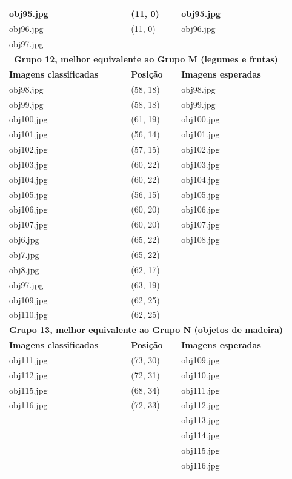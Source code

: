 \begin{center}
\begin{longtable}{|l|l|l|}
    obj95.jpg & (11, 0) & obj95.jpg \\
    \hline
    obj96.jpg & (11, 0) & obj96.jpg \\
    \hline
    obj97.jpg & & \\
    \hline\hline

    \multicolumn{3}{|c|}{\textbf{Grupo 12, melhor equivalente ao Grupo M
      (legumes e frutas)}} \\
    \hline\hline
    \textbf{Imagens classificadas} & \textbf{Posição} & \textbf{Imagens esperadas} \\
    \hline\hline

    obj98.jpg  & (58, 18) & obj98.jpg \\
    \hline
    obj99.jpg  & (58, 18) & obj99.jpg \\
    \hline
    obj100.jpg & (61, 19) & obj100.jpg \\
    \hline
    obj101.jpg & (56, 14) & obj101.jpg \\
    \hline
    obj102.jpg & (57, 15) & obj102.jpg \\
    \hline
    obj103.jpg & (60, 22) & obj103.jpg \\
    \hline
    obj104.jpg & (60, 22) & obj104.jpg \\
    \hline
    obj105.jpg & (56, 15) & obj105.jpg \\
    \hline
    obj106.jpg & (60, 20) & obj106.jpg \\
    \hline
    obj107.jpg & (60, 20) & obj107.jpg \\
    \hline
    obj6.jpg   & (65, 22) & obj108.jpg \\
    \hline
    obj7.jpg   & (65, 22) & \\
    \hline
    obj8.jpg   & (62, 17) & \\
    \hline
    obj97.jpg  & (63, 19) & \\
    \hline
    obj109.jpg & (62, 25) & \\
    \hline
    obj110.jpg & (62, 25) & \\
    \hline\hline

    \multicolumn{3}{|c|}{\textbf{Grupo 13, melhor equivalente ao Grupo N
      (objetos de madeira)}} \\
    \hline\hline
    \textbf{Imagens classificadas} & \textbf{Posição} & \textbf{Imagens esperadas} \\
    \hline\hline

    obj111.jpg & (73, 30) & obj109.jpg \\
    \hline
    obj112.jpg & (72, 31) & obj110.jpg \\
    \hline
    obj115.jpg & (68, 34) & obj111.jpg \\
    \hline
    obj116.jpg & (72, 33) & obj112.jpg \\
    \hline
    & & obj113.jpg \\
    \hline
    & & obj114.jpg \\
    \hline
    & & obj115.jpg \\
    \hline
    & & obj116.jpg \\
    \hline\hline


\end{longtable}
\end{center}
